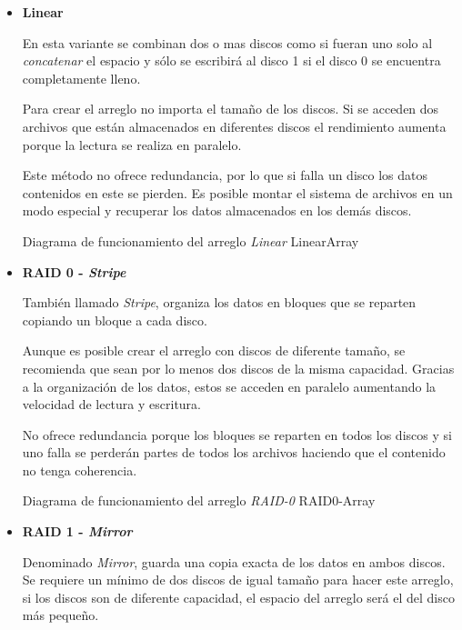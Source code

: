 \begin{itemize}

  \item \textbf{Linear}

En esta variante se combinan dos o mas discos como si fueran uno solo al \emph{concatenar} el espacio y s\'{o}lo se escribir\'{a} al disco 1 si el disco 0 se encuentra completamente lleno.

Para crear el arreglo no importa el tama\~{n}o de los discos. Si se acceden dos archivos que est\'{a}n almacenados en diferentes discos el rendimiento aumenta porque la lectura se realiza en paralelo.

Este m\'{e}todo no ofrece redundancia, por lo que si falla un disco los datos contenidos en este se pierden. Es posible montar el sistema de archivos en un modo especial y recuperar los datos almacenados en los dem\'{a}s discos.

\diagramblock
{Diagrama de funcionamiento del arreglo \textit{Linear}}
{LinearArray}
{
 {
  
 }
}

  \item \textbf{RAID 0 - \textit{Stripe}}

Tambi\'{e}n llamado \emph{Stripe}, organiza los datos en bloques que se reparten copiando un bloque a cada disco.

Aunque es posible crear el arreglo con discos de diferente tama\~{n}o, se recomienda que sean por lo menos dos discos de la misma capacidad. Gracias a la organizaci\'{o}n de los datos, estos se acceden en paralelo aumentando la velocidad de lectura y escritura.

No ofrece redundancia porque los bloques se reparten en todos los discos y si uno falla se perder\'{a}n partes de todos los archivos haciendo que el contenido no tenga coherencia.

\diagramblock
{Diagrama de funcionamiento del arreglo \textit{RAID-0}}
{RAID0-Array}
{
 {
  
 }
}

  \item \textbf{RAID 1 - \textit{Mirror}}

Denominado \emph{Mirror}, guarda una copia exacta de los datos en ambos discos. Se requiere un m\'{i}nimo de dos discos de igual tama\~{n}o para hacer este arreglo, si los discos son de diferente capacidad, el espacio del arreglo ser\'{a} el del disco m\'{a}s peque\~{n}o.


\end{itemize}
